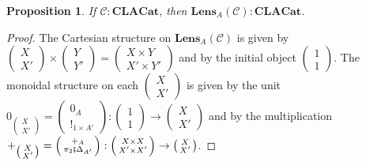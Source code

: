 \documentclass[11pt,a4paper,openright,twoside]{report}
\newcounter{mycounter}
\theoremstyle{plain}
\newtheorem{proposition}[mycounter]{Proposition}
\theoremstyle{definition}
\begin{document}
\begin{proposition}
  If $\mathcal{C} : \mathbf{CLACat}$, then $\mathbf{Lens}_A(\mathcal{C}) : \mathbf{CLACat}$.
\end{proposition}
\begin{proof}
  The Cartesian structure on $\mathbf{Lens}_A(\mathcal{C})$ is given by $\left(\begin{smallmatrix}X \\ X'\end{smallmatrix}\right) \times \left(\begin{smallmatrix}Y \\ Y'\end{smallmatrix}\right) = \left(\begin{smallmatrix}X\times Y \\ X' \times Y'\end{smallmatrix}\right)$ and by the initial object $\left(\begin{smallmatrix}1 \\ 1\end{smallmatrix}\right)$. The monoidal structure on each $\left(\begin{smallmatrix}X \\ X'\end{smallmatrix}\right)$ is given by the unit $0_{\left(\begin{smallmatrix}X \\ X'\end{smallmatrix}\right)} = \left(\begin{smallmatrix}0_A \\ !_{1 \times A'}\end{smallmatrix}\right): \left(\begin{smallmatrix}1 \\ 1\end{smallmatrix}\right) \to \left(\begin{smallmatrix}X \\ X'\end{smallmatrix}\right)$ and by the multiplication $+_{\left(\begin{smallmatrix}X \\ X'\end{smallmatrix}\right)} = \left(\begin{smallmatrix}+_A \\ \pi_2 \fatsemi \Delta_{A'}\end{smallmatrix}\right): \left(\begin{smallmatrix}X \times X \\ X' \times X'\end{smallmatrix}\right) \to \left(\begin{smallmatrix}X \\ X'\end{smallmatrix}\right)$.
\end{proof}
\end{document}
